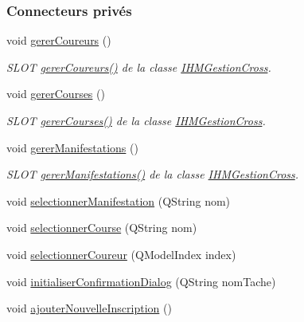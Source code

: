 \subsubsection*{Connecteurs privés}
\begin{DoxyCompactItemize}
\item 
void \hyperlink{class_i_h_m_gestion_cross_ad46a2295500cf98dbc18f862f6020103}{gerer\+Coureurs} ()
\begin{DoxyCompactList}\small\item\em S\+L\+OT \hyperlink{class_i_h_m_gestion_cross_ad46a2295500cf98dbc18f862f6020103}{gerer\+Coureurs()} de la classe \hyperlink{class_i_h_m_gestion_cross}{I\+H\+M\+Gestion\+Cross}. \end{DoxyCompactList}\item 
void \hyperlink{class_i_h_m_gestion_cross_a82e3861f4959d3599d1d85ee0b3b8654}{gerer\+Courses} ()
\begin{DoxyCompactList}\small\item\em S\+L\+OT \hyperlink{class_i_h_m_gestion_cross_a82e3861f4959d3599d1d85ee0b3b8654}{gerer\+Courses()} de la classe \hyperlink{class_i_h_m_gestion_cross}{I\+H\+M\+Gestion\+Cross}. \end{DoxyCompactList}\item 
void \hyperlink{class_i_h_m_gestion_cross_a406efb83dac8a8ac5d04e9b8cbeaf316}{gerer\+Manifestations} ()
\begin{DoxyCompactList}\small\item\em S\+L\+OT \hyperlink{class_i_h_m_gestion_cross_a406efb83dac8a8ac5d04e9b8cbeaf316}{gerer\+Manifestations()} de la classe \hyperlink{class_i_h_m_gestion_cross}{I\+H\+M\+Gestion\+Cross}. \end{DoxyCompactList}\item 
void \hyperlink{class_i_h_m_gestion_cross_a60fc58610d01534b3df66ac7dd76b4dc}{selectionner\+Manifestation} (Q\+String nom)
\item 
void \hyperlink{class_i_h_m_gestion_cross_ae555b32462455a2cdaf0f8dc2e016d14}{selectionner\+Course} (Q\+String nom)
\item 
void \hyperlink{class_i_h_m_gestion_cross_ad71963d500fd61995fdae94e833db163}{selectionner\+Coureur} (Q\+Model\+Index index)
\item 
void \hyperlink{class_i_h_m_gestion_cross_aa1c728319c825df582a014fc5bd43ea4}{initialiser\+Confirmation\+Dialog} (Q\+String nom\+Tache)
\item 
void \hyperlink{class_i_h_m_gestion_cross_af0165d32344af78b4edce59f88c90ff6}{ajouter\+Nouvelle\+Inscription} ()

\end{DoxyCompactItemize}
